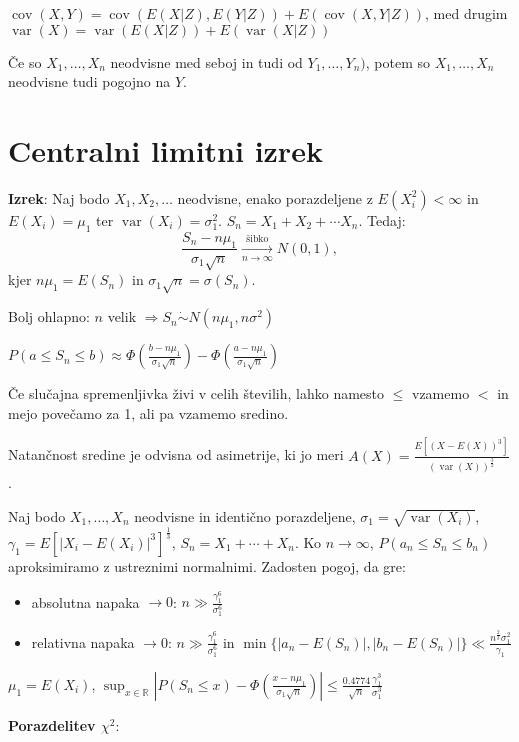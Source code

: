 \documentclass[11pt,a4paper]{amsart}
\theoremstyle{definition} %
\theoremstyle{plain} %
\newcommand{\R}{\mathbb R}
\DeclareMathOperator{\cov}{cov}
\DeclareMathOperator{\var}{var}
\begin{document}
$\cov(X,Y) = \cov(E(X|Z),E(Y|Z)) + E(\cov(X,Y|Z))$, med drugim $\var(X) =
\var(E(X|Z)) + E(\var(X|Z))$

Če so $X_1,\ldots , X_n$ neodvisne med seboj in tudi od $Y_1,\ldots , Y_n)$,
potem so $X_1,\ldots, X_n$ neodvisne tudi pogojno na $Y$.

\section*{Centralni limitni izrek}

\textbf{Izrek}: Naj bodo $X_1,X_2, \ldots$ neodvisne, enako porazdeljene z
$E(X_i^2) < \infty$ in $E(X_i) = \mu_1$ ter $\var(X_i) = \sigma_1^2$. $S_n = X_1
+ X_2 + \cdots X_n$. Tedaj:
$$
\frac{S_n - n\mu_1}{\sigma_1 \sqrt{n} } \xrightarrow[n\rightarrow \infty]{\text{šibko}} N(0,1),
$$
kjer $n\mu_1 = E(S_n)$ in $\sigma_1 \sqrt{n} = \sigma(S_n)$.

Bolj ohlapno: $n$ velik $\Longrightarrow S_n \dot{\sim} N(n\mu_1, n\sigma^2)$

$P(a \leq S_n \leq b) \approx \Phi(\frac{b-n\mu_1}{\sigma_1\sqrt{n}}) - \Phi
(\frac{a-n\mu_1}{\sigma_1 \sqrt{n}})$

Če slučajna spremenljivka živi v celih številih, lahko namesto $\leq$ vzamemo
$<$ in mejo povečamo za 1, ali pa vzamemo sredino.

Natančnost sredine je odvisna od asimetrije, ki jo meri $A(X) =
\frac{E[(X-E(X))^3]}{(\var(X))^{ \frac{3}{2}}}$.

Naj bodo $X_1,\ldots, X_n$ neodvisne in identično porazdeljene, $\sigma_1 =
\sqrt{\var(X_i)}$, $\gamma_1 = E[|X_i - E(X_i) |^3]^{\frac{1}{3}}$, $S_n = X_1
+ \cdots + X_n$. Ko $n \longrightarrow \infty$, $P(a_n \leq S_n \leq b_n)$
aproksimiramo z ustreznimi normalnimi. Zadosten pogoj, da gre:

\begin{itemize}
\item absolutna napaka $\rightarrow 0$: $n \gg \frac{\gamma_1^6}{\sigma_1^6}$
\item relativna napaka $\rightarrow 0$: $n \gg \frac{\gamma_1^6}{\sigma_1^6}$ in $\min \{ |a_n - E(S_n)|, |b_n - E(S_n)| \} \ll \frac{n^{\frac{2}{3}}\sigma_1^2}{\gamma_1}$
\end{itemize}

$\mu_1 = E(X_i)$, $\sup_{x\in \R} |P(S_n \leq x) - \Phi(
\frac{x-n\mu_1}{\sigma_1 \sqrt{n}} )| \leq \frac{0.4774}{\sqrt{n}}
\frac{\gamma_1^3}{\sigma_1^3}$

\textbf{Porazdelitev $\chi^2$}:
\end{document}
